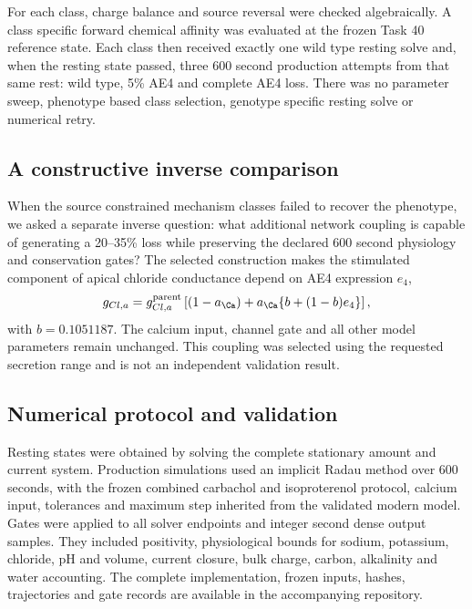 For each class, charge balance and source reversal were checked algebraically. A class specific forward chemical affinity was evaluated at the frozen Task 40 reference state. Each class then received exactly one wild type resting solve and, when the resting state passed, three 600 second production attempts from that same rest: wild type, 5\% AE4 and complete AE4 loss. There was no parameter sweep, phenotype based class selection, genotype specific resting solve or numerical retry.

\subsection{A constructive inverse comparison}

When the source constrained mechanism classes failed to recover the phenotype, we asked a separate inverse question: what additional network coupling is capable of generating a 20--35\% loss while preserving the declared 600 second physiology and conservation gates? The selected construction makes the stimulated component of apical chloride conductance depend on AE4 expression $e_4$,
\begin{equation}
\label{eq:cacc-coupling}
g_{Cl,a}=g_{Cl,a}^{\mathrm{parent}}
\left[(1-a_{\Ca})+a_{\Ca}\{b+(1-b)e_4\}\right],
\end{equation}
with $b=0.1051187$. The calcium input, channel gate and all other model parameters remain unchanged. This coupling was selected using the requested secretion range and is not an independent validation result.

\subsection{Numerical protocol and validation}

Resting states were obtained by solving the complete stationary amount and current system. Production simulations used an implicit Radau method over 600 seconds, with the frozen combined carbachol and isoproterenol protocol, calcium input, tolerances and maximum step inherited from the validated modern model. Gates were applied to all solver endpoints and integer second dense output samples. They included positivity, physiological bounds for sodium, potassium, chloride, pH and volume, current closure, bulk charge, carbon, alkalinity and water accounting. The complete implementation, frozen inputs, hashes, trajectories and gate records are available in the accompanying repository.

